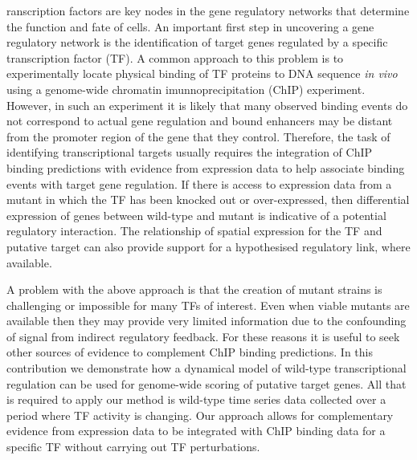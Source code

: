 \documentclass{pnastwo}
\begin{document}
\begin{article}
\begin{abstract}

\end{abstract}



ranscription factors are key nodes in the gene regulatory
networks that determine the function and fate of
cells. An important first step in uncovering a gene regulatory network
is the identification of target genes regulated by a specific
transcription factor (TF). A
common approach to this problem is to experimentally locate physical binding
of TF proteins to DNA sequence {\em in vivo} using a genome-wide
chromatin imunnoprecipitation (ChIP) experiment. However, in such an
experiment it is likely that many observed binding events do not
correspond to actual gene regulation and bound enhancers may be
distant from the promoter region of the gene that they control. Therefore, the task of identifying transcriptional
targets usually requires the integration of ChIP binding predictions
with evidence from expression data to help associate binding events
with target gene regulation. If there is access to expression data from a mutant in which the TF has
been knocked out or over-expressed, then differential expression of genes between wild-type
and mutant is indicative of a potential regulatory
interaction. The relationship of spatial expression for the
TF and putative target can also provide support for a hypothesised
regulatory link, where available. 

A problem with the above approach is that the creation of mutant
strains is challenging or impossible for many TFs of interest. Even
when viable mutants are available then they may provide very limited information due to the
confounding of signal from indirect regulatory feedback. For these reasons it
is useful to seek other sources of evidence to complement ChIP binding
predictions. In this contribution we demonstrate how a dynamical model of wild-type transcriptional
regulation can be used for genome-wide scoring of putative target genes. All that is required to apply
our method is wild-type time series data collected over a period
where TF activity is changing. Our approach allows for complementary
evidence from expression data to be integrated with ChIP binding data
for a specific TF without carrying out TF perturbations. 


\end{article}
\end{document}
